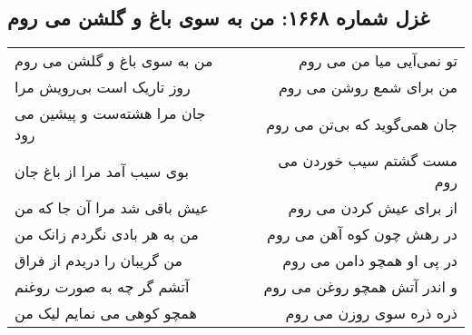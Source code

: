 \begin{center}
\section*{غزل شماره ۱۶۶۸: من به سوی باغ و گلشن می روم}
\label{sec:1668}
\begin{longtable}{l p{0.5cm} r}
من به سوی باغ و گلشن می روم
&&
تو نمی‌آیی میا من می روم
\\
روز تاریک است بی‌رویش مرا
&&
من برای شمع روشن می روم
\\
جان مرا هشته‌ست و پیشین می رود
&&
جان همی‌گوید که بی‌تن می روم
\\
بوی سیب آمد مرا از باغ جان
&&
مست گشتم سیب خوردن می روم
\\
عیش باقی شد مرا آن جا که من
&&
از برای عیش کردن می روم
\\
من به هر بادی نگردم زانک من
&&
در رهش چون کوه آهن می روم
\\
من گریبان را دریدم از فراق
&&
در پی او همچو دامن می روم
\\
آتشم گر چه به صورت روغنم
&&
و اندر آتش همچو روغن می روم
\\
همچو کوهی می نمایم لیک من
&&
ذره ذره سوی روزن می روم
\\
\end{longtable}
\end{center}
